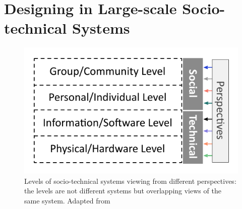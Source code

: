 \section{Designing in Large-scale Socio-technical Systems}
\label{sec:design}



\begin{figure}[t]
\sidecaption[t]
\includegraphics[scale=.68]{img/sts_levels.pdf}
\caption{Levels of socio-technical systems viewing from different perspectives: the levels are not different systems but overlapping views of the same system. Adapted from \cite{Whitworth2009,Whitworth2013}}
\label{fig:sts_levels} 
\end{figure}

